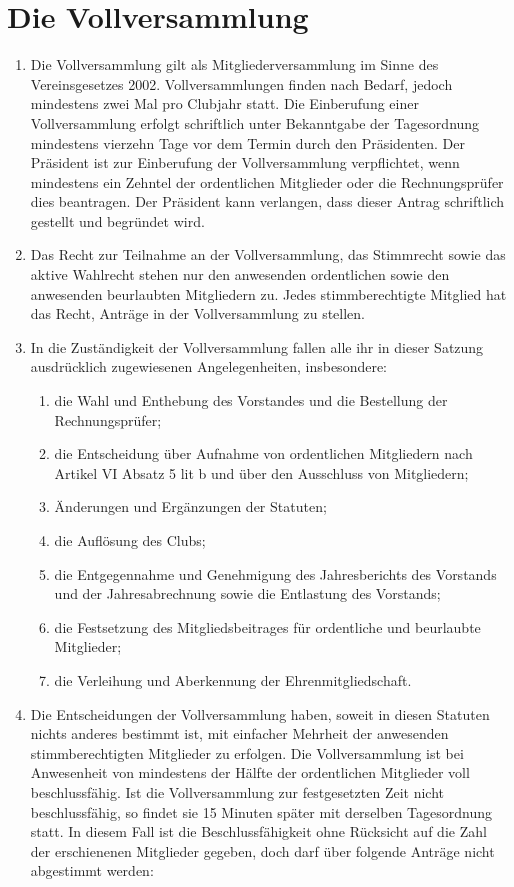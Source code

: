 \documentclass{article}
\begin{document}
\section{Die Vollversammlung}
\begin{enumerate}
    \item Die Vollversammlung gilt als Mitgliederversammlung im Sinne des Vereinsgesetzes 2002. Vollversammlungen finden nach Bedarf, jedoch mindestens zwei Mal pro Clubjahr statt. Die Einberufung einer Vollversammlung erfolgt schriftlich unter Bekanntgabe der Tagesordnung mindestens vierzehn Tage vor dem Termin durch den Präsidenten. Der Präsident ist zur Einberufung der Vollversammlung verpflichtet, wenn mindestens ein Zehntel der ordentlichen Mitglieder oder die Rechnungsprüfer dies beantragen. Der Präsident kann verlangen, dass dieser Antrag schriftlich gestellt und begründet wird.
    \item Das Recht zur Teilnahme an der Vollversammlung, das Stimmrecht sowie das aktive Wahlrecht stehen nur den anwesenden ordentlichen sowie den anwesenden beurlaubten Mitgliedern zu. Jedes stimmberechtigte Mitglied hat das Recht, Anträge in der Vollversammlung zu stellen.
    \item In die Zuständigkeit der Vollversammlung fallen alle ihr in dieser Satzung ausdrücklich zugewiesenen Angelegenheiten, insbesondere:
    \begin{enumerate}
        \item die Wahl und Enthebung des Vorstandes und die Bestellung der Rechnungsprüfer;
        \item die Entscheidung über Aufnahme von ordentlichen Mitgliedern nach Artikel VI Absatz 5 lit b und über den Ausschluss von Mitgliedern;
        \item Änderungen und Ergänzungen der Statuten;
        \item die Auflösung des Clubs;
        \item die Entgegennahme und Genehmigung des Jahresberichts des Vorstands und der Jahresabrechnung sowie die Entlastung des Vorstands;
        \item die Festsetzung des Mitgliedsbeitrages für ordentliche und beurlaubte Mitglieder;
        \item die Verleihung und Aberkennung der Ehrenmitgliedschaft.
    \end{enumerate}
    \item Die Entscheidungen der Vollversammlung haben, soweit in diesen Statuten nichts anderes bestimmt ist, mit einfacher Mehrheit der anwesenden stimmberechtigten Mitglieder zu erfolgen. Die Vollversammlung ist bei Anwesenheit von mindestens der Hälfte der ordentlichen Mitglieder voll beschlussfähig. Ist die Vollversammlung zur festgesetzten Zeit nicht beschlussfähig, so findet sie 15 Minuten später mit derselben Tagesordnung statt. In diesem Fall ist die Beschlussfähigkeit ohne Rücksicht auf die Zahl der erschienenen Mitglieder gegeben, doch darf über folgende Anträge nicht abgestimmt werden:

\end{enumerate}
\end{document}
